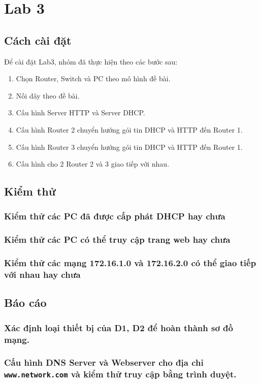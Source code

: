 \documentclass[]{article}
\begin{document}
\section{Lab 3}
\subsection{Cách cài đặt}
Để cài đặt Lab3, nhóm đã thực hiện theo các bước sau:
\begin{enumerate}
    \item Chọn Router, Switch và PC theo mô hình đề bài.
    \item Nối dây theo đề bài.
    \item Cấu hình Server HTTP và Server DHCP.
    \item Cấu hình Router 2 chuyển hướng gói tin DHCP và HTTP đến Router 1.
    \item Cấu hình Router 3 chuyển hướng gói tin DHCP và HTTP đến Router 1.
    \item Cấu hình cho 2 Router 2 và 3 giao tiếp với nhau.
\end{enumerate}
\subsection{Kiểm thử}
\subsubsection{Kiểm thử các PC đã được cấp phát DHCP hay chưa}
\subsubsection{Kiểm thử các PC có thể truy cập trang web hay chưa}
\subsubsection{Kiểm thử các mạng 172.16.1.0 và 172.16.2.0 có thể giao tiếp với nhau hay chưa}
\subsection{Báo cáo}
\subsubsection{Xác định loại thiết bị của D1, D2 để hoàn thành sơ đồ mạng.}
\subsubsection{Cấu hình DNS Server và Webserver cho địa chỉ \texttt{www.network.com} và kiểm thử truy cập bằng trình duyệt.}
\end{document}

